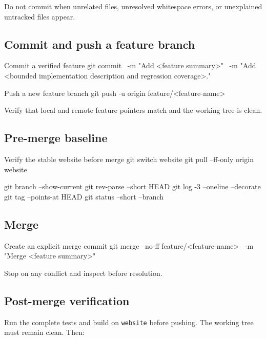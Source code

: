 \documentclass[11pt,letterpaper]{article}
\newcommand{\branchname}[1]{\texttt{#1}}
\begin{document}
Do not commit when unrelated files, unresolved whitespace errors, or unexplained
untracked files appear.

\subsection{Commit and push a feature branch}

\begin{commandbox}{Commit a verified feature}
git commit \
  -m "Add <feature summary>" \
  -m "Add <bounded implementation description and regression coverage>."
\end{commandbox}

\begin{commandbox}{Push a new feature branch}
git push -u origin feature/<feature-name>
\end{commandbox}

Verify that local and remote feature pointers match and the working tree is
clean.

\subsection{Pre-merge baseline}

\begin{commandbox}{Verify the stable website before merge}
git switch website
git pull --ff-only origin website

git branch --show-current
git rev-parse --short HEAD
git log -3 --oneline --decorate
git tag --points-at HEAD
git status --short --branch
\end{commandbox}

\subsection{Merge}

\begin{commandbox}{Create an explicit merge commit}
git merge --no-ff feature/<feature-name> \
  -m "Merge <feature summary>"
\end{commandbox}

Stop on any conflict and inspect before resolution.

\subsection{Post-merge verification}

Run the complete tests and build on \branchname{website} before pushing. The
working tree must remain clean. Then:
\end{document}
